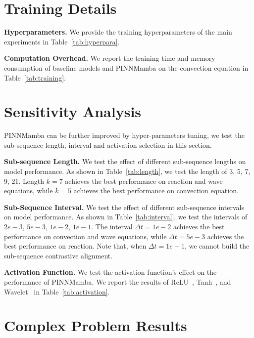 \section{Training Details}
\label{apx:hyperparam}

\textbf{Hyperparameters.} We provide the training hyperparameters of the main experiments in Table~\ref{tab:hyperpara}.


 

\textbf{Computation Overhead.} We report the training time and memory consumption of baseline models and PINNMamba on the convection equation in Table~\ref{tab:training}. 



\section{Sensitivity Analysis}

PINNMamba can be further improved by hyper-parameters tuning, we test the sub-sequence length, interval and activation selection in this section.

\label{apx:sense}

\textbf{Sub-sequence Length.} We test the effect of different sub-sequence lengths on model performance. As shown in Table~\ref{tab:length}, we test the length of 3, 5, 7, 9, 21.  Length $k =7$ achieves the best performance on reaction and wave equations, while  $k =5$ achieves the best performance on convection equation.



\textbf{Sub-Sequence Interval.}  We test the effect of different sub-sequence intervals on model performance. As shown in Table~\ref{tab:interval}, we test the intervals of $2e-3$, $5e-3$, $1e-2$, $1e-1$. The interval $\Delta t =1e-2$ achieves the best performance on convection and wave equations, while $\Delta t = 5e-3$ achieves the best performance on reaction. Note that, when $\Delta t = 1e-1$, we cannot build the sub-sequence contrastive alignment.



\textbf{Activation Function.} We test the activation function's effect on the performance of PINNMamba. We report the results of ReLU~\cite{nair2010rectified}, Tanh~\cite{fan2000extended}, and Wavelet~\cite{zhao2024pinnsformer} in Table~\ref{tab:activation}.


\section{Complex Problem Results}
\label{apx:comp}

